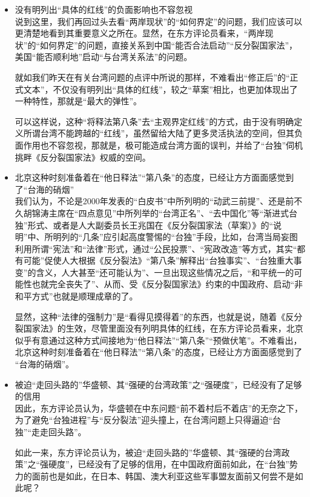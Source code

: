 \documentclass[a4paper,11pt]{article}
\begin{document}
\begin{itemize}
\begin{itemize}
\item 没有明列出“具体的红线”的负面影响也不容忽视\\
\label{sec-3_2_7}%
说到这里，我们再回过头去看“两岸现状”的“如何界定”的问题，我们应该可以更清楚地看到其重要意义之所在。显然，在东方评论员看来，“两岸现状”的“如何界定”的问题，直接关系到中国“能否合法启动”“反分裂国家法”，美国“能否顺利地”启动“与台湾关系法”的问题。

    就如我们昨天在有关台湾问题的点评中所说的那样，不难看出“修正后”的“正式文本”，不仅没有明列出“具体的红线”，较之“草案”相比，也更加体现出了一种特性，那就是“最大的弹性”。

    可以这样说，这种“将释法第八条”去“主观界定红线”的方式，由于没有明确定义所谓台湾不能跨越的“红线”，虽然留给大陆了更多灵活执法的空间，但其负面作用也不容忽视，那就是，极可能造成台湾方面的误判，并给了“台独”伺机挑畔《反分裂国家法》权威的空间。
 

\item 北京这种时刻准备着在“他日释法”“第八条”的态度，已经让方方面面感觉到了“台海的硝烟”\\
\label{sec-3_2_8}%
我们认为，不论是2000年发表的“白皮书”中所列明的“动武三前提”、还是前不久胡锦涛主席在“四点意见”中所列举的“台湾正名”、“去中国化”等“渐进式台独”形式、或者是人大副委员长王兆国在《反分裂国家法（草案）》的“说明”中、所明列的“几条”应引起高度警惕的“台独”手段，比如，台湾当局妄图利用所谓“宪法”和“法律”形式，通过“公民投票”、“宪政改造”等方式，其实“都有可能”促使人大根据《反分裂法》“第八条”解释出“台独事实”、“台独重大事变”的含义，人大甚至“还可能认为”、一旦出现这些情况之后，“和平统一的可能性也就完全丧失了”、从而、受《反分裂国家法》约束的中国政府、启动“非和平方式”也就是顺理成章的了。

    显然，这种“法律的强制力”是“看得见摸得着”的东西，也就是说，随着《反分裂国家法》的生效，尽管里面没有列明具体的红线，在东方评论员看来，北京似乎有意通过这种方式间接地为“他日释法”“第八条”“预做伏笔”。不难看出，北京这种时刻准备着在“他日释法”“第八条”的态度，已经让方方面面感觉到了 “台海的硝烟”。
 
 

\item 被迫“走回头路的”华盛顿、其“强硬的台湾政策”之“强硬度”，已经没有了足够的信用\\
\label{sec-3_2_9}%
因此，东方评论员认为，华盛顿在中东问题“前不着村后不着店”的无奈之下，为了避免“台独进程”与“反分裂法”迎头撞上，在台湾问题上只得逼迫“台独”“走走回头路”。

    如此一来，东方评论员认为，被迫“走回头路的”华盛顿、其“强硬的台湾政策”之“强硬度”，已经没有了足够的信用，在中国政府面前如此，在“台独”势力的面前也是如此，在日本、韩国、澳大利亚这些军事盟友面前又何尝不是如此呢？
 


\end{itemize}
\end{itemize}
\end{document}
